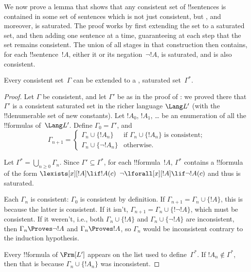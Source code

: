 \documentclass[../../../include/open-logic-section]{subfiles}
\begin{document}

We now prove a lemma that shows that any consistent set of
!!{sentence}s is contained in some set of sentences which is not just
consistent, but
, and moreover, is saturated. The proof
works by first extending the set to a saturated set, and then adding
one sentence at a time, guaranteeing at each step
that the set remains consistent. The union of all stages in that
construction then contains, for each !!{sentence}~$!A$, either it or
its negation~$\lnot !A$, is saturated, and is also consistent.

\begin{lem}
Every consistent set~$\Gamma$ can be extended to a
,
saturated set~$\Gamma^*$.
\end{lem}

\begin{proof}
Let $\Gamma$ be consistent, and let $\Gamma'$ be as in the proof of
: we proved there that $\Gamma'$
is a consistent saturated set in the richer language $\Lang L'$ (with
the !!{denumerable} set of new constants).  Let $!A_0$, $!A_1$, \dots{}
be an enumeration of all the !!{formula}s of~$\Lang L'$.  Define
$\Gamma_0 = \Gamma'$, and
\[
\Gamma_{n+1} =
\begin{cases}
\Gamma_n \cup \{ !A_n \} & \textrm{if $\Gamma_n \cup \{!A_n\}$ is
  consistent;} \\
\Gamma_n \cup \{ \lnot !A_n \} & \textrm{otherwise.}
\end{cases}
\]

Let $\Gamma^* = \bigcup_{n \geq 0} \Gamma_n$. Since $\Gamma' \subseteq
\Gamma^*$, for each !!{formula}~$!A$, $\Gamma^*$ contains a
!!{formula} of the form
{$\lexists[x][!A] \lif !A(c)$}
{$\lnot\lforall[x][!A] \lif \lnot !A(c)$}
and thus is saturated.

Each $\Gamma_n$ is consistent: $\Gamma_0$ is consistent by
definition.  If $\Gamma_{n+1} = \Gamma_n \cup \{!A\}$, this is because
the latter is consistent.  If it isn't, $\Gamma_{n+1} = \Gamma_n \cup
\{!\lnot !A\}$, which must be consistent.  If it weren't, i.e., both
$\Gamma_n \cup \{!A\}$ and $\Gamma_n \cup \{\lnot !A\}$ are
inconsistent, then $\Gamma_n \Proves \lnot !A$ and $\Gamma_n \Proves
!A$, so $\Gamma_n$ would be inconsistent contrary to the induction
hypothesis.

Every !!{formula} of $\Frm[L']$ appears on the list used to
define~$\Gamma^*$. If $!A_n \notin \Gamma^*$, then that is because
$\Gamma_n \cup \{!A_n\}$ was inconsistent.
\end{proof}
\end{document}

